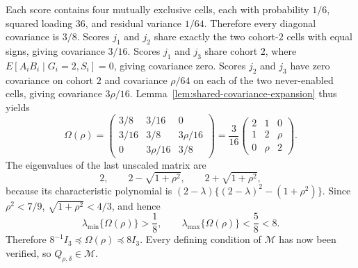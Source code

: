 Each score contains four mutually exclusive cells, each with probability \(1/6\), squared loading \(36\), and residual variance \(1/64\). Therefore every diagonal covariance is \(3/8\). Scores \(j_1\) and \(j_2\) share exactly the two cohort-\(2\) cells with equal signs, giving covariance \(3/16\). Scores \(j_1\) and \(j_3\) share cohort \(2\), where \(E[A_iB_i\mid G_i=2,S_i]=0\), giving covariance zero. Scores \(j_2\) and \(j_3\) have zero covariance on cohort \(2\) and covariance \(\rho/64\) on each of the two never-enabled cells, giving covariance \(3\rho/16\). Lemma~\ref{lem:shared-covariance-expansion} thus yields
\[
 \Omega(\rho)=
 \begin{pmatrix}
 3/8&3/16&0\\
 3/16&3/8&3\rho/16\\
 0&3\rho/16&3/8
 \end{pmatrix}
 =\frac3{16}
 \begin{pmatrix}
 2&1&0\\
 1&2&\rho\\
 0&\rho&2
 \end{pmatrix}.
\]
The eigenvalues of the last unscaled matrix are
\[
 2,
 \qquad 2-\sqrt{1+\rho^2},
 \qquad 2+\sqrt{1+\rho^2},
\]
because its characteristic polynomial is \((2-\lambda)\{(2-\lambda)^2-(1+\rho^2)\}\). Since \(\rho^2<7/9\), \(\sqrt{1+\rho^2}<4/3\), and hence
\[
 \lambda_{\min}\{\Omega(\rho)\}>\frac18,
 \qquad
 \lambda_{\max}\{\Omega(\rho)\}<\frac58<8.
\]
Therefore \(8^{-1}I_3\preceq\Omega(\rho)\preceq8I_3\). Every defining condition of \(\mathcal M\) has now been verified, so \(Q_{\rho,\delta}\in\mathcal M\).

